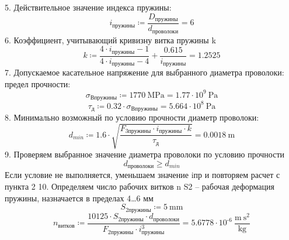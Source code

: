 \documentclass{article}
\newcommand{\defeq}{\coloneq} %
\begin{document}
\colorbox[HTML]{000000}{5. Действительное значение индекса пружины:}\newline
\begin{equation*}
i_{пружины} \defeq \frac{D_{пружины}}{d_{проволоки}} = {6}
\end{equation*}
\colorbox[HTML]{000000}{6. Коэффициент, учитывающий кривизну витка пружины k}\newline
\begin{equation*}
k \defeq \frac{4 \cdot i_{пружины}-1}{4 \cdot i_{пружины}-4}+\frac{0.615}{i_{пружины}} = {1.2525}
\end{equation*}
\colorbox[HTML]{000000}{7. Допускаемое касательное напряжение для выбранного диаметра проволоки:}\newline
\colorbox[HTML]{000000}{предел прочности:}\newline
\begin{equation*}
σ_{Впружины} \defeq 1770 \: \mathrm{MPa} = {1.77 \cdot 10^{9} \: \mathrm{Pa}}
\end{equation*}
\begin{equation*}
τ_{д} \defeq 0.32 \cdot σ_{Впружины} = {5.664 \cdot 10^{8} \: \mathrm{Pa}}
\end{equation*}
\colorbox[HTML]{000000}{8. Минимально возможный по условию прочности диаметр проволоки:}\newline
\begin{equation*}
d_{min} \defeq 1.6 \cdot \sqrt{\frac{\textit{F}_{\textit{3пружины}} \cdot i_{пружины} \cdot k}{τ_{д}}} = {0.0018 \: \mathrm{m}}
\end{equation*}
\colorbox[HTML]{000000}{9. Проверяем выбранное значение диаметра проволоки по условию прочности }\newline
\begin{equation*}
d_{проволоки} \geq d_{min}
\end{equation*}
\colorbox[HTML]{000000}{Если условие не выполняется, уменьшаем значение iпр и повторяем расчет с пункта 2}\newline
\colorbox[HTML]{000000}{10. Определяем число рабочих витков n}\newline
\colorbox[HTML]{000000}{S2 – рабочая деформация пружины, назначается в пределах 4…6 мм}\newline
\begin{equation*}
\textit{S}_{\textit{2пружины}} \defeq 5 \: \mathrm{mm}
\end{equation*}
\begin{equation*}
n_{витков} \defeq \frac{10125 \cdot \textit{S}_{\textit{2пружины}} \cdot d_{проволоки}}{\textit{F}_{\textit{2пружины}} \cdot i_{пружины}^{3}} = {5.6778 \cdot 10^{ \operatorname{-} 6} \: \frac{\mathrm{m} \: \mathrm{s}^{2}}{\mathrm{kg}}}
\end{equation*}
\end{document}
